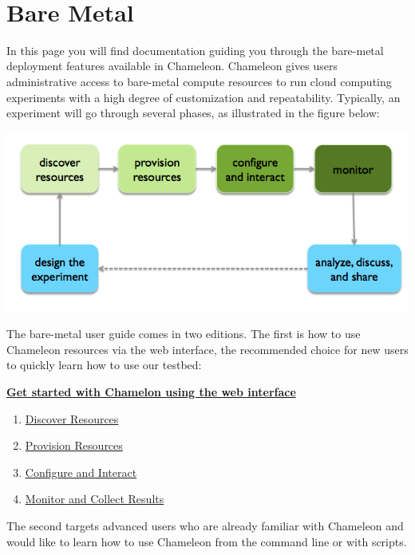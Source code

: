 \FILENAME\

\section{Bare Metal}\label{C:cc-baremetal}

In this page you will find documentation guiding you through the
bare-metal deployment features available in Chameleon. Chameleon gives
users administrative access to bare-metal compute resources to
run cloud computing experiments with a high degree of customization
and repeatability. Typically, an experiment will go through several
phases, as illustrated in the figure below:


\includegraphics[width=\columnwidth]{images/chameleon/baremetal.png}


The bare-metal user guide comes in two editions. The first is how to use
Chameleon resources via the web interface, the recommended choice for
new users to quickly learn how to use our testbed:

\textbf{\href{https://www.chameleoncloud.org/discover-resources}{Get
started with Chamelon using the web interface}}

\begin{enumerate}
\item
  \href{https://www.chameleoncloud.org/discover-resources/}{Discover
  Resources}
\item
  \href{https://www.chameleoncloud.org/provision-resources/}{Provision
  Resources} 
\item
  \href{https://www.chameleoncloud.org/configure-and-interact/}{Configure
  and Interact}
\item
  \href{https://www.chameleoncloud.org/monitor-and-collect/}{Monitor and
  Collect Results}
\end{enumerate}

The second targets advanced users who are already familiar with
Chameleon and would like to learn how to use Chameleon from the command
line or with scripts.

